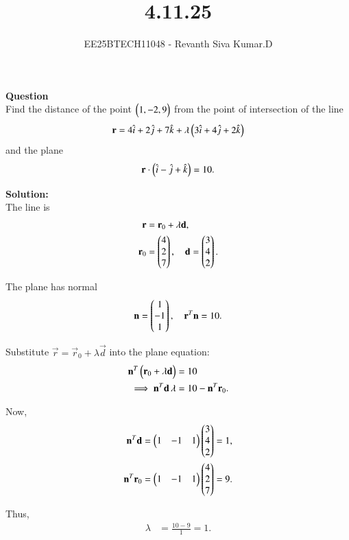 \documentclass[journal]{IEEEtran}
\begin{document}

\vspace{3cm}

\title{4.11.25}
\author{EE25BTECH11048 - Revanth Siva Kumar.D}
{\let\newpage\relax\maketitle}

\textbf{Question} \\
Find the distance of the point $\begin{pmatrix}1,-2,9\end{pmatrix}$ from the point of intersection of the line
\[
\mathbf{r} = 4\hat{i} + 2\hat{j} + 7\hat{k} + \lambda \begin{pmatrix}3\hat{i} + 4\hat{j} + 2\hat{k}\end{pmatrix}
\]
and the plane
\[
\mathbf{r}\cdot\begin{pmatrix}\hat{i} - \hat{j} + \hat{k}\end{pmatrix} = 10.
\]

\textbf{Solution:} \\

The line is
\begin{align}
    \mathbf{r} &= \mathbf{r}_0 + \lambda \mathbf{d}, \\
    \mathbf{r}_0 &= \begin{pmatrix}4 \\ 2 \\ 7\end{pmatrix}, \quad
    \mathbf{d} = \begin{pmatrix}3 \\ 4 \\ 2\end{pmatrix}.
\end{align}

The plane has normal
\begin{align}
    \mathbf{n} = \begin{pmatrix}1 \\ -1 \\ 1\end{pmatrix}, \quad \mathbf{r}^T \mathbf{n} = 10.
\end{align}

Substitute $\vec{r} = \vec{r}_0 + \lambda \vec{d}$ into the plane equation:
\begin{align}
    \mathbf{n}^T\begin{pmatrix}\mathbf{r}_0 + \lambda \mathbf{d}\end{pmatrix} &= 10 \\
    \implies \mathbf{n}^T\mathbf{d}\,\lambda &= 10 - \mathbf{n}^T\mathbf{r}_0.
\end{align}

Now,
\begin{align}
    \mathbf{n}^T\mathbf{d} &= \begin{pmatrix}1 & -1 & 1\end{pmatrix}\begin{pmatrix}3 \\ 4 \\ 2\end{pmatrix} = 1, \\
    \mathbf{n}^T\mathbf{r}_0 &= \begin{pmatrix}1 & -1 & 1\end{pmatrix}\begin{pmatrix}4 \\ 2 \\ 7\end{pmatrix} = 9.
\end{align}

Thus,
\begin{align}
    \lambda &= \frac{10-9}{1} = 1.
\end{align}
\end{document}
